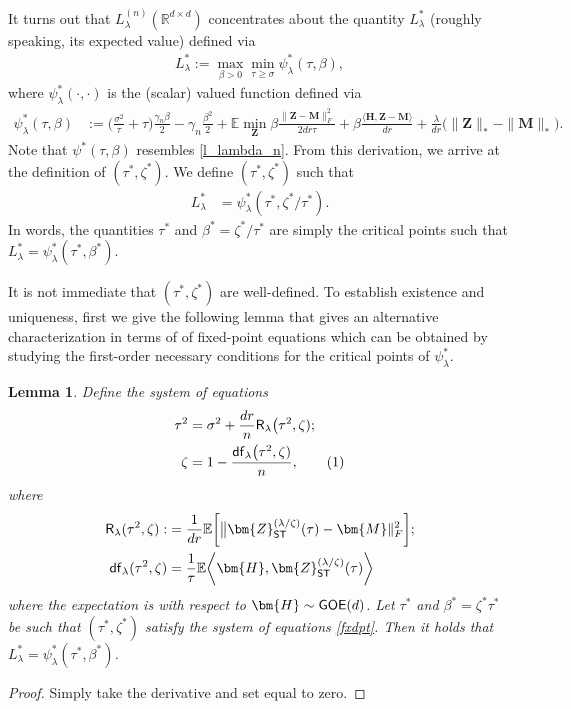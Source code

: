 \documentclass[10pt]{article}
\newcommand\numberthis{\addtocounter{equation}{1}\tag{\theequation}}
\newcommand{\s}{^*}
\newtheorem{lemma}{Lemma}
\theoremstyle{definition}
\begin{document}
It turns out that $L_{\lambda}^{(n)}(\mathbb{R}^{d\times d})$ concentrates about the quantity $L_{\lambda}^{*}$ (roughly speaking, its expected value) defined via 
\begin{align}
    L_{\lambda}^* := \max_{\beta > 0} \min_{\tau \geq \sigma} \psi_{\lambda}^* (\tau,\beta),
\end{align}
where  $\psi^*_{\lambda}(\cdot,\cdot)$ is the (scalar) valued function defined via
\begin{align}
        \psi^{*}_{\lambda}(\tau,\beta) &:= \bigg( \frac{\sigma^2}{\tau} + \tau \bigg) \frac{\gamma_n \beta}{2} - \gamma_n \frac{\beta^2}{2} +  \mathbb{E} \min_{\bm{Z}} \beta\frac{\|\bm{Z} - \bm{M} \|_F^2}{2dr \tau}  + \beta \frac{\langle \bm{H}, \bm{Z} - \bm{M} \rangle}{dr}  + \frac{\lambda}{dr} \big( \| \bm{Z}\|_* - \|\bm{M} \|_* \big). 
\end{align}
Note that $\psi^*(\tau,\beta)$ resembles \eqref{l_lambda_n}.   
From this derivation, we arrive at the definition of $(\tau\s,\zeta\s)$. We define $(\tau\s,\zeta\s)$ such that 
\begin{align*}
    L_{\lambda}\s &= \psi_{\lambda}\s(\tau\s, \zeta\s/\tau\s).
\end{align*}
In words, the quantities $\tau\s$ and $ \beta\s = \zeta\s/\tau\s$ are simply the critical points such that $L_{\lambda}^{*} = \psi^*_{\lambda}(\tau\s,\beta\s)$.  


It is not immediate that $(\tau\s,\zeta\s)$ are well-defined.  To establish existence and uniqueness, first we give the following lemma that gives an alternative characterization in terms of  of fixed-point equations which can be obtained by studying the first-order necessary conditions for the critical points of $\psi_{\lambda}^*$.


\begin{lemma}\label{lem:saddlepoint}
Define the system of equations
\begin{subequations}
\label{fxdpt}
 \begin{align}
    \tau^2 &= \sigma^2 + \frac{dr}{n} {\sf R}_{\lambda}\big( \tau^2, \zeta); \label{fxtpt1} \\
    \zeta &=1 -  \frac{{\sf df}_{\lambda}\big( \tau^2,\zeta)}{n},  \numberthis \label{fxdpt2}
\end{align}
\end{subequations}
where  
\begin{align}
    {\sf R}_{\lambda}(\tau^2,\zeta) :&=  \frac{1}{dr} \mathbb{E} \bigg[ \big\| \bm{ Z}_{\sf ST}^{(\lambda/\zeta)}(\tau) - \bm{M} \|_F^2 \bigg ];  \\ 
    {\sf df}_{\lambda}(\tau^2,\zeta) &= \frac{1}{\tau} \mathbb{E} \bigg\langle \bm{H} ,  \bm{ Z}_{\sf ST}^{(\lambda/\zeta)}(\tau) \bigg\rangle 
\end{align}
where the expectation is with respect to $\bm{H} \sim {\sf GOE}(d)$.   Let $\tau\s$ and $\beta\s = \zeta\s \tau\s$ be such that $(\tau\s,\zeta\s)$ satisfy the system of equations \eqref{fxdpt}.  Then it holds that $L^{*}_{\lambda} = \psi^{*}_{\lambda}(\tau\s,\beta\s)$. 
\end{lemma}
\begin{proof}
    Simply take the derivative and set equal to zero.  
\end{proof}
\end{document}
